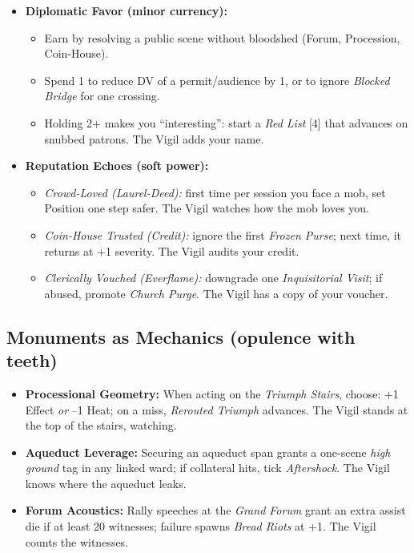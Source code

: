 \begin{itemize}
  \item \textbf{Diplomatic Favor (minor currency):}
  \begin{itemize}
    \item Earn by resolving a public scene without bloodshed (Forum, Procession, Coin-House).
    \item Spend 1 to reduce DV of a permit/audience by 1, or to ignore \emph{Blocked Bridge} for one crossing.
    \item Holding 2+ makes you ``interesting'': start a \emph{Red List} [4] that advances on snubbed patrons. The Vigil adds your name.
  \end{itemize}

  \item \textbf{Reputation Echoes (soft power):}
  \begin{itemize}
    \item \emph{Crowd-Loved (Laurel-Deed):} first time per session you face a mob, set Position one step safer. The Vigil watches how the mob loves you.
    \item \emph{Coin-House Trusted (Credit):} ignore the first \emph{Frozen Purse}; next time, it returns at +1 severity. The Vigil audits your credit.
    \item \emph{Clerically Vouched (Everflame):} downgrade one \emph{Inquisitorial Visit}; if abused, promote \emph{Church Purge}. The Vigil has a copy of your voucher.
  \end{itemize}
\end{itemize}

\subsection*{Monuments as Mechanics (opulence with teeth)}
\begin{itemize}
  \item \textbf{Processional Geometry:} When acting on the \emph{Triumph Stairs}, choose: +1 Effect \emph{or} --1 Heat; on a miss, \emph{Rerouted Triumph} advances. The Vigil stands at the top of the stairs, watching.
  \item \textbf{Aqueduct Leverage:} Securing an aqueduct span grants a one-scene \emph{high ground} tag in any linked ward; if collateral hits, tick \emph{Aftershock}. The Vigil knows where the aqueduct leaks.
  \item \textbf{Forum Acoustics:} Rally speeches at the \emph{Grand Forum} grant an extra assist die if at least 20 witnesses; failure spawns \emph{Bread Riots} at +1. The Vigil counts the witnesses.
\end{itemize}

